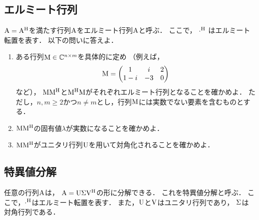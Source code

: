 \subsection{エルミート行列}
  $\mathrm{A} = \mathrm{A}^\mathrm{H}$を満たす行列$\mathrm{A}$をエルミート行列$\mathrm{A}$と呼ぶ．
  ここで， $\cdot^\mathrm{H}$ はエルミート転置を表す．
  以下の問いに答えよ．
  \begin{enumerate}[label=(\roman*)]
    \item ある行列$\mathrm{M} \in \mathbb{C}^{n \times m}$を具体的に定め
      （例えば，
        \begin{equation}
          \mathrm{M} =
            \begin{pmatrix}
              1     & i  & 2 \\
              1 - i & -3 & 0 \\
            \end{pmatrix}
        \end{equation}
        など），
      $\mathrm{M}\mathrm{M}^\mathrm{H}$と$\mathrm{M}^\mathrm{H}\mathrm{M}$がそれぞれエルミート行列となることを確かめよ．
      ただし，$n, m \ge 2$かつ$n \neq m$とし，行列$\mathrm{M}$には実数でない要素を含むものとする．
    \item $\mathrm{M}\mathrm{M}^\mathrm{H}$の固有値$\lambda$が実数になることを確かめよ．
    \item $\mathrm{M}\mathrm{M}^\mathrm{H}$がユニタリ行列$\mathrm{U}$を用いて対角化されることを確かめよ．
  \end{enumerate}

\subsection{特異値分解 \label{linalg:svd}}
  任意の行列$\mathrm{A}$は，
  $\mathrm{A}=\mathrm{U}\mathrm{\Sigma}\mathrm{V}^\mathrm{H}$の形に分解できる．
  これを特異値分解と呼ぶ．
  ここで，$\cdot^\mathrm{H}$はエルミート転置を表す．
  また，$\mathrm{U}$と$\mathrm{V}$はユニタリ行列であり，
  $\mathrm{\Sigma}$は対角行列である．

